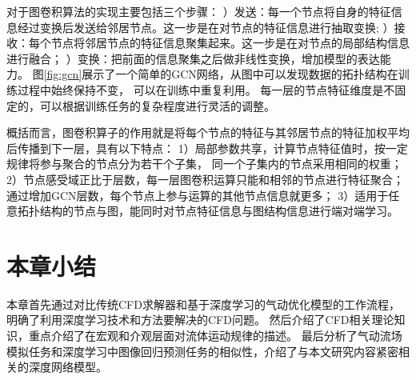 对于图卷积算法的实现主要包括三个步骤：
）发送：每一个节点将自身的特征信息经过变换后发送给邻居节点。这一步是在对节点的特征信息进行抽取变换;
）接收：每个节点将邻居节点的特征信息聚集起来。这一步是在对节点的局部结构信息进行融合；
）变换：把前面的信息聚集之后做非线性变换，增加模型的表达能力。
图\ref{fig:gcn}展示了一个简单的GCN网络，从图中可以发现数据的拓扑结构在训练过程中始终保持不变，
可以在训练中重复利用。
每一层的节点特征维度是不固定的，可以根据训练任务的复杂程度进行灵活的调整。

概括而言，图卷积算子的作用就是将每个节点的特征与其邻居节点的特征加权平均后传播到下一层，具有以下特点：
1）局部参数共享，计算节点特征值时，按一定规律将参与聚合的节点分为若干个子集，
同一个子集内的节点采用相同的权重；
2）节点感受域正比于层数，每一层图卷积运算只能和相邻的节点进行特征聚合；通过增加GCN层数，每个节点上参与运算的其他节点信息就更多；
3）适用于任意拓扑结构的节点与图，能同时对节点特征信息与图结构信息进行端对端学习。





\section{本章小结}

本章首先通过对比传统CFD求解器和基于深度学习的气动优化模型的工作流程，明确了利用深度学习技术和方法要解决的CFD问题。
然后介绍了CFD相关理论知识，重点介绍了在宏观和介观层面对流体运动规律的描述。
最后分析了气动流场模拟任务和深度学习中图像回归预测任务的相似性，介绍了与本文研究内容紧密相关的深度网络模型。





